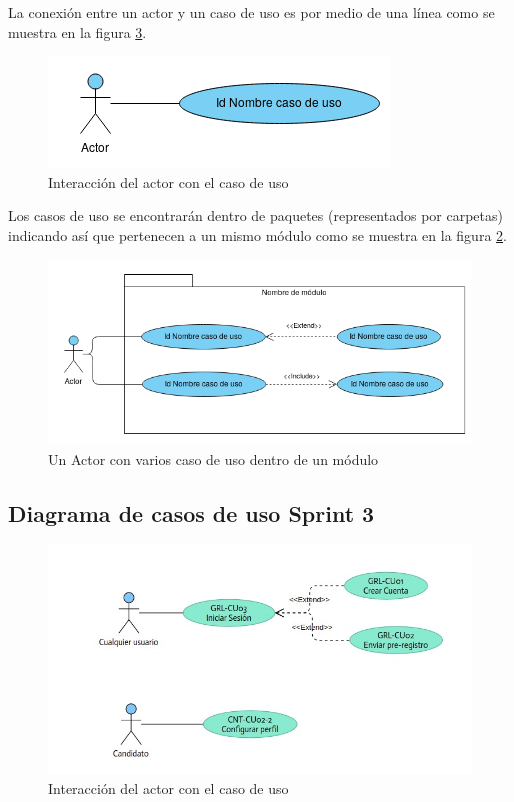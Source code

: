 La conexión entre un actor y un caso de uso es por medio de una línea como se muestra en la figura \ref{fig:acUC}.

\begin{figure}[hbtp!]
	\begin{center}
		\includegraphics[width=.4\textwidth]{LIT/ActorUC}
	\end{center}
	\label{fig:acUC}
	\caption{Interacción del actor con el caso de uso}
\end{figure}

Los casos de uso se encontrarán dentro de paquetes (representados por carpetas) indicando así que pertenecen a un mismo módulo como se muestra en la figura \ref{fig:pack}.

\begin{figure}[hbtp!]
	\begin{center}
		\includegraphics[width=.7\textwidth]{LIT/Paquete}
	\end{center}
	\label{fig:pack}
	\caption{Un Actor con varios caso de uso dentro de un módulo}
\end{figure}

\pagebreak
\subsection{Diagrama de casos de uso Sprint 3}
\begin{figure}[hbtp!]
	\begin{center}
		\includegraphics[width=.5\textwidth]{propuesta/imagenes/sprint3.jpeg}
	\end{center}
	\label{fig:acUC}
	\caption{Interacción del actor con el caso de uso}
\end{figure}

